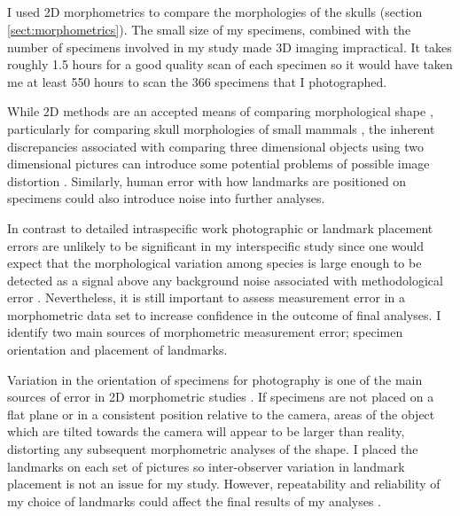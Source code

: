 
\subsection{}

	I used 2D morphometrics to compare the morphologies of the skulls (section \ref{sect:morphometrics}). The small size of my specimens, combined with the number of specimens involved in my study made 3D imaging impractical. It takes roughly 1.5 hours for a good quality scan of each specimen so it would have taken me at least 550 hours to scan the 366 specimens that I photographed.
	 
	While 2D methods are an accepted means of comparing morphological shape \citep[e.g.][]{Adams2004, Mitteroecker2009}, particularly for comparing skull morphologies of small mammals \citep[e.g.][]{Cardini2003, Panchetti2008, White2008, Barrow2008, Scalici2011}, the inherent discrepancies associated with comparing three dimensional objects using two dimensional pictures can introduce some potential problems of possible image distortion \citep{Arnqvist1998}. Similarly, human error with how landmarks are positioned on specimens could also introduce noise into further analyses. 
	
	In contrast to detailed intraspecific work \citep[e.g.][]{Bornholdt2008, Blagojevic2011} photographic or landmark placement errors are unlikely to be significant in my interspecific study since one would expect that the morphological variation among species is large enough to  be detected as a signal above any background noise associated with methodological error \citep{Arnqvist1998}. Nevertheless, it is still important to assess measurement error in a morphometric data set to increase confidence in the outcome of final analyses.
	I identify two main sources of morphometric measurement error; specimen orientation and placement of landmarks.

	Variation in the orientation of specimens for photography is one of the main sources of error in 2D morphometric studies \citep{Adriaens2007}. If specimens are not placed on a flat plane or in a consistent position relative to the camera, areas of the object which are tilted towards the camera will appear to be larger than reality, distorting any subsequent morphometric analyses of the shape. 
	I placed the landmarks on each set of pictures so inter-observer variation in landmark placement is not an issue for my study.  However, repeatability and reliability of my choice of landmarks could affect the final results of my analyses \citep{Arnqvist1998}.

